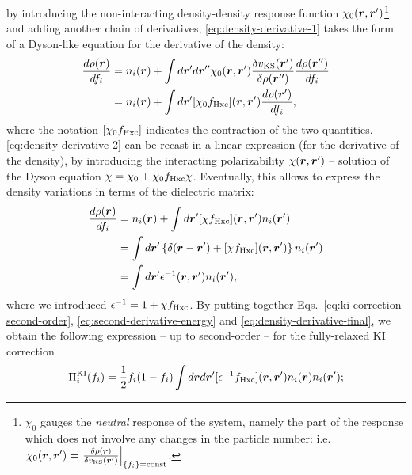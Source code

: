 %
by introducing the non-interacting density-density response function $\chi_0({\bm r},{\bm r}')$\footnote{$\chi_0$ gauges the \emph{neutral} response of the system, namely the part of the response which does not involve any changes in the particle number: i.e. $\chi_0({\bm r},{\bm r}') = \left. \frac{\delta\rho({\bm r})}{\delta v_{\rm KS}({\bm r}')} \right|_{\{ f_i \} = {\rm const}}$.} and adding another chain of derivatives, \cref{eq:density-derivative-1} takes the form of a Dyson-like equation for the derivative of the density:
%
\begin{equation}
    \begin{split}
    \frac{d\rho({\bm r})}{df_i} &= n_i({\bm r}) + \int d{\bm r}' d{\bm r}'' \chi_0({\bm r},{\bm r}') \frac{\delta v_{\rm KS}({\bm r}')}{\delta \rho({\bm r}'')} \frac{d\rho({\bm r}'')}{df_i} \\
    &= n_i({\bm r}) + \int d{\bm r}' [\chi_0 f_{\rm Hxc}]({\bm r},{\bm r}') \frac{d\rho({\bm r}')}{df_i} ,
    \end{split}
    \label{eq:density-derivative-2}
\end{equation}
%
where the notation $[\chi_0 f_{\rm Hxc}]$ indicates the contraction of the two quantities. \cref{eq:density-derivative-2} can be recast in a linear expression (for the derivative of the density), by introducing the interacting polarizability $\chi({\bm r},{\bm r}')$ -- solution of the Dyson equation $\chi = \chi_0 + \chi_0 f_{\rm Hxc} \chi$. Eventually, this allows to express the density variations in terms of the dielectric matrix:
%
\begin{equation}
    \begin{split}
    \frac{d\rho({\bm r})}{df_i} &= n_i({\bm r}) + \int d{\bm r}' [\chi f_{\rm Hxc}]({\bm r},{\bm r}') n_i({\bm r}') \\
    &= \int d{\bm r}' \left\{ \delta({\bm r}-{\bm r}') + [\chi f_{\rm Hxc}]({\bm r},{\bm r}') \right\} n_i({\bm r}') \\
    &= \int d{\bm r}' \epsilon^{-1}({\bm r},{\bm r}') n_i({\bm r}') ,
    \end{split}
    \label{eq:density-derivative-final}
\end{equation}
%
where we introduced $\epsilon^{-1} = 1 + \chi f_{\rm Hxc}$. By putting together Eqs.~\eqref{eq:ki-correction-second-order}, \eqref{eq:second-derivative-energy} and \eqref{eq:density-derivative-final}, we obtain the following expression -- up to second-order -- for the fully-relaxed KI correction
%
\begin{equation}
    \Pi_i^{\rm KI}(f_i) = \frac{1}{2} f_i(1-f_i) \int d{\bm r} d{\bm r}' [\epsilon^{-1} f_{\rm Hxc}]({\bm r},{\bm r}') n_i({\bm r}) n_i({\bm r}') ;
    \label{eq:relaxed-ki-second-order}
\end{equation}

